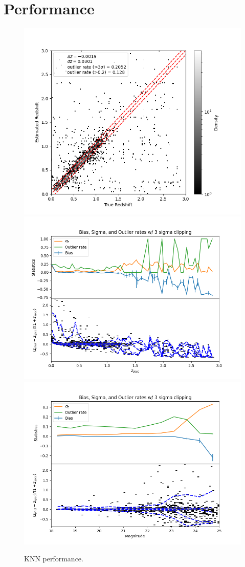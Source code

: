 \section{Performance}
\label{sec:performance:0}



\begin{figure}
    \centering
    \includegraphics[width=0.33\linewidth]{figures/zestimate_v_ztrue_hist2d_knn.png}
    \includegraphics[width=0.33\linewidth]{figures/biweight_stats_v_redshift_knn.png}
    \includegraphics[width=0.33\linewidth]{figures/biweight_stats_v_mag_knn.png}
    \caption{KNN performance.}
    \label{fig:perf_knn}
\end{figure}

